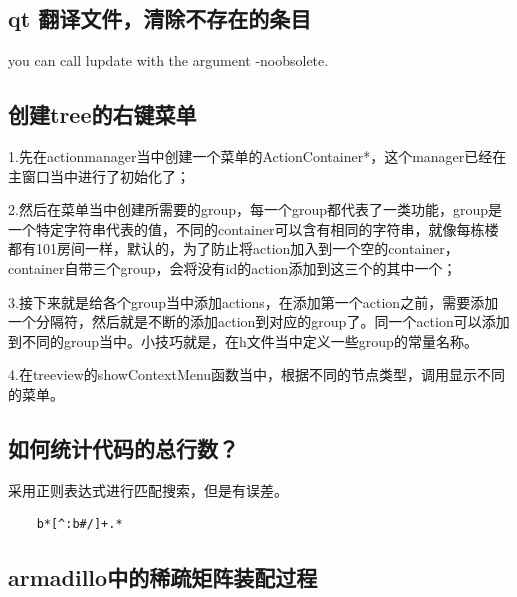 \subsection{qt 翻译文件，清除不存在的条目}
you can call lupdate with the argument -noobsolete. 
\subsection{创建tree的右键菜单}
1.先在actionmanager当中创建一个菜单的ActionContainer*，这个manager已经在主窗口当中进行了初始化了；

2.然后在菜单当中创建所需要的group，每一个group都代表了一类功能，group是一个特定字符串代表的值，不同的container可以含有相同的字符串，就像每栋楼都有101房间一样，默认的，为了防止将action加入到一个空的container，container自带三个group，会将没有id的action添加到这三个的其中一个；

3.接下来就是给各个group当中添加actions，在添加第一个action之前，需要添加一个分隔符，然后就是不断的添加action到对应的group了。同一个action可以添加到不同的group当中。小技巧就是，在h文件当中定义一些group的常量名称。

4.在treeview的showContextMenu函数当中，根据不同的节点类型，调用显示不同的菜单。
\subsection{如何统计代码的总行数？}
采用正则表达式进行匹配搜索，但是有误差。
\begin{lstlisting}
	b*[^:b#/]+.*
\end{lstlisting}
\subsection{armadillo中的稀疏矩阵装配过程}
